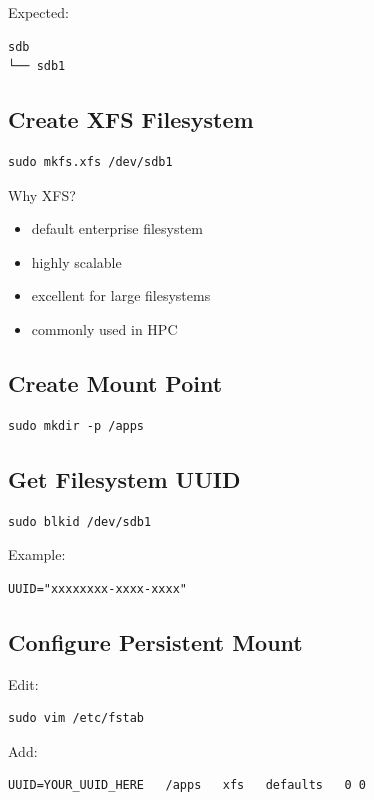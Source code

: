 \documentclass[11pt]{article}
\begin{document}
Expected:

\begin{verbatim}
sdb
└── sdb1
\end{verbatim}
\subsection{Create XFS Filesystem}
\label{sec:org1c69fa5}

\begin{verbatim}
sudo mkfs.xfs /dev/sdb1
\end{verbatim}

Why XFS?

\begin{itemize}
\item default enterprise filesystem
\item highly scalable
\item excellent for large filesystems
\item commonly used in HPC
\end{itemize}
\subsection{Create Mount Point}
\label{sec:orgfd94871}

\begin{verbatim}
sudo mkdir -p /apps
\end{verbatim}
\subsection{Get Filesystem UUID}
\label{sec:org536be65}

\begin{verbatim}
sudo blkid /dev/sdb1
\end{verbatim}

Example:

\begin{verbatim}
UUID="xxxxxxxx-xxxx-xxxx"
\end{verbatim}
\subsection{Configure Persistent Mount}
\label{sec:org595ebf5}

Edit:

\begin{verbatim}
sudo vim /etc/fstab
\end{verbatim}

Add:

\begin{verbatim}
UUID=YOUR_UUID_HERE   /apps   xfs   defaults   0 0
\end{verbatim}
\end{document}
